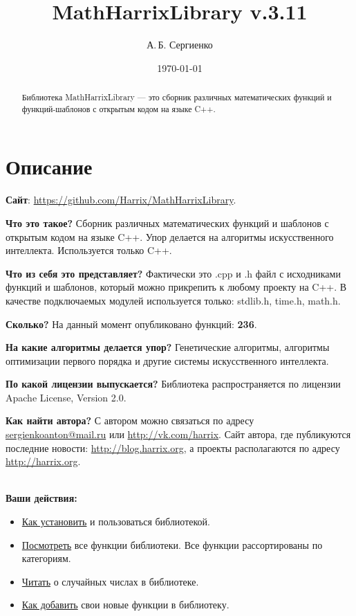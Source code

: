 \documentclass[a4paper,12pt]{article}
\title{MathHarrixLibrary v.3.11}
\author{А.\,Б. Сергиенко}
\date{\today}
\begin{document}


\maketitle

\begin{abstract}
Библиотека MathHarrixLibrary --- это сборник различных математических функций и функций-шаблонов с открытым кодом на языке C++.
\end{abstract}

\tableofcontents

\newpage

\section{Описание}

\textbf{Сайт}: \href{https://github.com/Harrix/MathHarrixLibrary}{https://github.com/Harrix/MathHarrixLibrary}.

\textbf{Что это такое?} Сборник различных математических функций и шаблонов с открытым кодом на языке C++. Упор делается на алгоритмы искусственного интеллекта. Используется только C++.

\textbf{Что из себя это представляет?} Фактически это .cpp и .h файл с исходниками функций и шаблонов, который можно прикрепить к любому проекту на C++. В качестве подключаемых модулей используется только: stdlib.h, time.h, math.h.

\textbf{Сколько?} На данный момент опубликовано функций: \textbf{236}.

\textbf{На какие алгоритмы делается упор?} Генетические алгоритмы, алгоритмы оптимизации первого порядка и другие системы искусственного интеллекта.

\textbf{По какой лицензии выпускается?} Библиотека распространяется по лицензии Apache License, Version 2.0.

\textbf{Как найти автора?} С автором можно связаться по адресу \href {mailto:sergienkoanton@mail.ru} {sergienkoanton@mail.ru} или  \href {http://vk.com/harrix} {http://vk.com/harrix}. Сайт автора, где публикуются последние новости: \href {http://blog.harrix.org} {http://blog.harrix.org}, а проекты располагаются по адресу \href {http://harrix.org} {http://harrix.org}.

~\\

\textbf{Ваши действия:}

\begin{itemize}
\item \hyperref[section_install]{Как установить} и пользоваться библиотекой.
\item \hyperref[section_listfunctions]{Посмотреть} все функции библиотеки. Все функции рассортированы по категориям.
\item \hyperref[section_random]{Читать} о случайных числах в библиотеке.
\item \hyperref[section_addnew]{Как добавить} свои новые функции в библиотеку.
\end{itemize}
\end{document}
